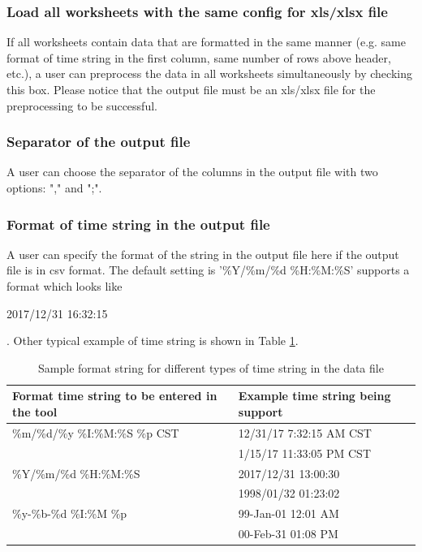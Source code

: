 \documentclass[12pt,a4paper]{article}
\begin{document}
\subsubsection{Load all worksheets with the same config for xls/xlsx file}
If all worksheets contain data that are formatted in the same manner (e.g. same format of time string in the first column, same number of rows above header, etc.), a user can preprocess the data in all worksheets simultaneously by checking this box.
Please notice that the output file must be an xls/xlsx file for the preprocessing to be successful.

\subsubsection{Separator of the output file}
A user can choose the separator of the columns in the output file with two options: "," and ";".

\subsubsection{Format of time string in the output file}
\label{subsec:format_time_output}
A user can specify the format of the string in the output file here if the output file is in csv format.
The default setting is '\%Y/\%m/\%d \%H:\%M:\%S' supports a format which looks like

2017/12/31 16:32:15

. Other typical example of time string is shown in Table \ref{tb:sample_timestring}.

\begin{table}[H]
\caption{Sample format string for different types of time string in the data file}
\begin{tabular}{|p{6cm}|l|}
\hline
Format time string to be entered in the tool & Example time string being support \\ \hline
\%m/\%d/\%y \%I:\%M:\%S \%p CST & 12/31/17 7:32:15 AM CST  \\
 & 1/15/17 11:33:05 PM CST \\ \hline
\%Y/\%m/\%d \%H:\%M:\%S & 2017/12/31 13:00:30  \\
 & 1998/01/32 01:23:02 \\ \hline
 \%y-\%b-\%d \%I:\%M \%p & 99-Jan-01 12:01 AM \\
 & 00-Feb-31 01:08 PM \\ \hline
\end{tabular}
\label{tb:sample_timestring}
\end{table}
\end{document}
